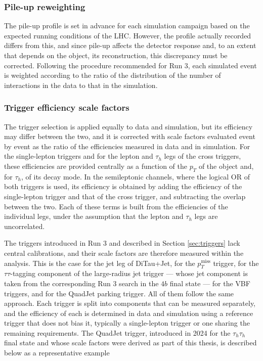 %
\subsubsection{Pile-up reweighting}
%
The pile-up profile is set in advance for each simulation campaign based on the expected running conditions of the LHC. However, the profile actually recorded differs from this, and since pile-up affects the detector response and, to an extent that depends on the object, its reconstruction, this discrepancy must be corrected. Following the procedure recommended for Run 3, each simulated event is weighted according to the ratio of the distribution of the number of interactions in the data to that in the simulation.



\subsubsection{Trigger efficiency scale factors}
%
The trigger selection is applied equally to data and simulation, but its efficiency may differ between the two, and it is corrected with scale factors evaluated event by event as the ratio of the efficiencies measured in data and in simulation. For the single-lepton triggers and for the lepton and $\tau_h$ legs of the cross triggers, these efficiencies are provided centrally as a function of the $p_T$ of the object and, for $\tau_h$, of its decay mode. In the semileptonic channels, where the logical OR of both triggers is used, its efficiency is obtained by adding the efficiency of the single-lepton trigger and that of the cross trigger, and subtracting the overlap between the two. Each of these terms is built from the efficiencies of the individual legs, under the assumption that the lepton and $\tau_h$ legs are uncorrelated.\medskip

The triggers introduced in Run 3 and described in Section \ref{sec:triggers} lack central calibrations, and their scale factors are therefore measured within the analysis. This is the case for the jet leg of DiTau+Jet, for the $p_T^\text{miss}$ trigger, for the $\tau\tau$-tagging component of the large-radius jet trigger — whose jet component is taken from the corresponding Run 3 search in the $4b$ final state — for the VBF triggers, and for the QuadJet parking trigger. All of them follow the same approach. Each trigger is split into components that can be measured separately, and the efficiency of each is determined in data and simulation using a reference trigger that does not bias it, typically a single-lepton trigger or one sharing the remaining requirements. The QuadJet trigger, introduced in 2024 for the $\tau_h\tau_h$ final state and whose scale factors were derived as part of this thesis, is described below as a representative example

